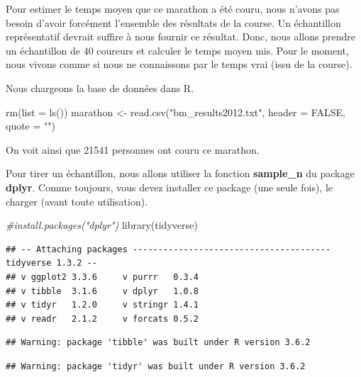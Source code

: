 \documentclass[
]{article}
\newenvironment{Shaded}{\begin{snugshade}}{\end{snugshade}}
\newcommand{\AttributeTok}[1]{\textcolor[rgb]{0.77,0.63,0.00}{#1}}
\newcommand{\CommentTok}[1]{\textcolor[rgb]{0.56,0.35,0.01}{\textit{#1}}}
\newcommand{\ConstantTok}[1]{\textcolor[rgb]{0.00,0.00,0.00}{#1}}
\newcommand{\FunctionTok}[1]{\textcolor[rgb]{0.00,0.00,0.00}{#1}}
\newcommand{\NormalTok}[1]{#1}
\newcommand{\OtherTok}[1]{\textcolor[rgb]{0.56,0.35,0.01}{#1}}
\newcommand{\StringTok}[1]{\textcolor[rgb]{0.31,0.60,0.02}{#1}}
\begin{document}
Pour estimer le temps moyen que ce marathon a été couru, nous n'avons
pas besoin d'avoir forcément l'ensemble des résultats de la course. Un
échantillon représentatif devrait suffire à nous fournir ce résultat.
Donc, nous allons prendre un échantillon de 40 coureurs et calculer le
temps moyen mis. Pour le moment, nous vivons comme si nous ne
connaissons par le temps vrai (issu de la course).

Nous chargeons la base de données dans R.

\begin{Shaded}
\begin{Highlighting}[]
\FunctionTok{rm}\NormalTok{(}\AttributeTok{list =} \FunctionTok{ls}\NormalTok{())}
\NormalTok{marathon }\OtherTok{\textless{}{-}} \FunctionTok{read.csv}\NormalTok{(}\StringTok{"bm\_results2012.txt"}\NormalTok{, }\AttributeTok{header =} \ConstantTok{FALSE}\NormalTok{, }\AttributeTok{quote =} \StringTok{""}\NormalTok{)}
\end{Highlighting}
\end{Shaded}

On voit ainsi que 21541 personnes ont couru ce marathon.

Pour tirer un échantillon, nous allons utiliser la fonction
\textbf{sample\_n} du package \textbf{dplyr}. Comme toujours, vous devez
installer ce package (une seule fois), le charger (avant toute
utilisation).

\begin{Shaded}
\begin{Highlighting}[]
\CommentTok{\#install.packages("dplyr")}
\FunctionTok{library}\NormalTok{(tidyverse)}
\end{Highlighting}
\end{Shaded}

\begin{verbatim}
## -- Attaching packages --------------------------------------- tidyverse 1.3.2 --
## v ggplot2 3.3.6     v purrr   0.3.4
## v tibble  3.1.6     v dplyr   1.0.8
## v tidyr   1.2.0     v stringr 1.4.1
## v readr   2.1.2     v forcats 0.5.2
\end{verbatim}

\begin{verbatim}
## Warning: package 'tibble' was built under R version 3.6.2
\end{verbatim}

\begin{verbatim}
## Warning: package 'tidyr' was built under R version 3.6.2
\end{verbatim}
\end{document}
